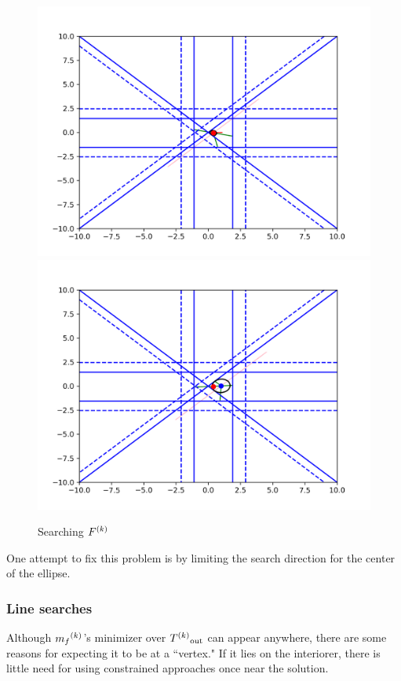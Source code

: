 \begin{figure}[h]
    \centering
    \includegraphics[scale=0.4]{images/everything_runs_1.png}
    \includegraphics[scale=0.4]{images/everything_runs_2.png}
    \caption{Searching ${F}^{(k)}$}
    \label{ellipse_runs_away}
\end{figure}


One attempt to fix this problem is by limiting the search direction for the center of the ellipse.


\subsubsection{Line searches}
Although ${{m}_f}^{(k)}$'s minimizer over ${T^{(k)}}_{\text{out}}$  can appear anywhere, there are some reasons for expecting it to be at a ``vertex."
If it lies on the interiorer, there is little need for using constrained approaches once near the solution.

